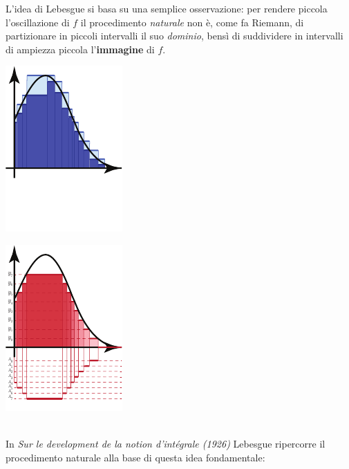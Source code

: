 L’idea di Lebesgue si basa su una semplice osservazione: per rendere piccola l’oscillazione di $f$ il procedimento \textit{naturale} non è, come fa Riemann, di partizionare in piccoli intervalli il suo \textit{dominio}, bensì di suddividere in intervalli
di ampiezza piccola l’\textbf{immagine} di $f$.\\
\begin{minipage}{0.5\textwidth}
	\begin{center}
		\includegraphics[trim=0cm 0cm 0cm 0cm, clip, scale=1.6]{images/lebesgueriemann1}
	\end{center}
\end{minipage}
\begin{minipage}{0.5\textwidth}
	\begin{center}
		\includegraphics[trim=0cm 0cm 0cm 0cm, clip, scale=1.6]{images/lebesgueriemann2}
	\end{center}
\end{minipage}\\
In \textit{Sur le development de la notion d'intégrale (1926)} Lebesgue ripercorre il procedimento naturale alla base di questa idea fondamentale:
